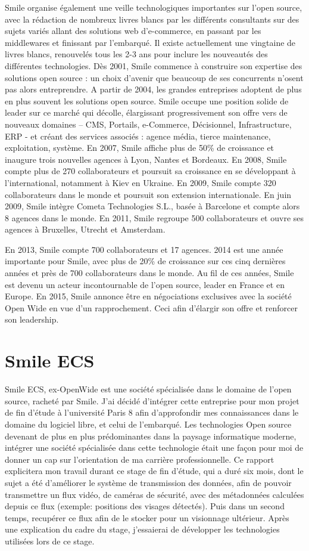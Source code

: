 Smile organise également une veille technologiques importantes sur l’open source, avec la
rédaction de nombreux livres blancs par les différents consultants sur des sujets variés allant
des solutions web d’e-commerce, en passant par les middlewares et finissant par
l’embarqué. Il existe actuellement une vingtaine de livres blancs, renouvelés tous les 2-3 ans
pour inclure les nouveautés des différentes technologies.
Dès 2001, Smile commence à construire son expertise des solutions open source : un choix
d’avenir que beaucoup de ses concurrents n’osent pas alors entreprendre.
A partir de 2004, les grandes entreprises adoptent de plus en plus souvent les solutions open
source. Smile occupe une position solide de leader sur ce marché qui décolle, élargissant
progressivement son offre vers de nouveaux domaines – CMS, Portails, e-Commerce,
Décisionnel, Infrastructure, ERP - et créant des services associés : agence média, tierce
maintenance, exploitation, système. En 2007, Smile affiche plus de 50\% de croissance et
inaugure trois nouvelles agences à Lyon, Nantes et Bordeaux.
En 2008, Smile compte plus de 270 collaborateurs et poursuit sa croissance en se
développant à l'international, notamment à Kiev en Ukraine.
En 2009, Smile compte 320 collaborateurs dans le monde et poursuit son extension
internationale. En juin 2009, Smile intègre Cometa Technologies S.L., basée à Barcelone et
compte alors 8 agences dans le monde.
En 2011, Smile regroupe 500 collaborateurs et ouvre ses agences à Bruxelles, Utrecht et
Amsterdam.

En 2013, Smile compte 700 collaborateurs et 17 agences.
2014 est une année importante pour Smile, avec plus de 20\% de croissance sur ces cinq
dernières années et près de 700 collaborateurs dans le monde. Au fil de ces années, Smile est
devenu un acteur incontournable de l’open source, leader en France et en Europe.
En 2015, Smile annonce être en négociations exclusives avec la société Open Wide en vue
d’un rapprochement. Ceci afin d'élargir son offre et renforcer son leadership.


\section{Smile ECS}
Smile ECS, ex-OpenWide est une société spécialisée dans le domaine de l'open source, racheté par Smile. J'ai décidé d'intégrer cette entreprise pour mon projet de fin d'étude à l'université Paris 8 afin
d'approfondir mes connaissances dans le domaine du logiciel libre, et celui de l'embarqué.
 Les technologies Open source devenant de plus en plus prédominantes dans la paysage informatique
moderne, intégrer une société spécialisée dans cette technologie était une façon pour
moi de donner un cap sur l'orientation de ma carrière professionnelle.
Ce rapport explicitera mon travail durant ce stage de fin d'étude, qui a duré
six mois, dont le sujet a été d'améliorer le système de transmission des données,
afin de pouvoir transmettre un flux vidéo, de caméras de sécurité, avec des métadonnées
calculées depuis ce flux (exemple: positions des visages détectés). Puis dans un second temps,
recupérer ce flux afin de le stocker pour un visionnage ultérieur.
Après une explication du cadre du stage, j'essaierai de développer les technologies
utilisées lors de ce stage.
